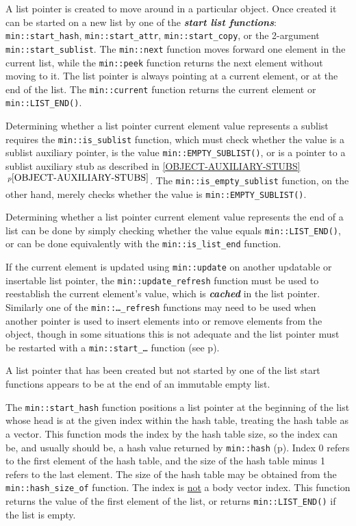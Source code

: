 \documentclass[12pt]{article}
\newcommand{\skey}[2]{{\bf \em #1#2}\index{#1}}
\newcommand{\ikey}[2]{{\bf \em #1}\index{#2}}
\newcommand{\itemref}[1]{\ref{#1}$\,^{p\pageref{#1}}$}
\newcommand{\pagref}[1]{p\pageref{#1}}
\newcommand{\EOL}{\penalty \exhyphenpenalty}
\begin{document}
A list pointer is created to move around in a particular object.
Once created it can be started on a new list by one of the
\skey{start list function}s:
{\tt min::\EOL start\_\EOL hash}, {\tt min::\EOL start\_\EOL attr},
{\tt min::\EOL start\_\EOL copy}, or
the 2-argument {\tt min::\EOL start\_\EOL sublist}.
The {\tt min::\EOL next} function moves forward one element
in the current list,
while the {\tt min::\EOL peek} function returns the next element without
moving to it.
The list pointer is always pointing at a current element, or at
the end of the list.
The {\tt min::\EOL current} function returns the current element
or {\tt min::\EOL LIST\_\EOL END()}.

Determining whether a list pointer current element value
represents a sublist requires
the {\tt min::\EOL is\_\EOL sublist} function, which must check whether the
value is a sublist auxiliary pointer,
is the value {\tt min::\EOL EMPTY\_\EOL SUBLIST()},
or is a pointer to a sublist auxiliary stub as described in
\itemref{OBJECT-AUXILIARY-STUBS}.
The {\tt min::\EOL is\_\EOL empty\_\EOL sublist}
function, on the other hand, merely checks whether the value is
{\tt min::\EOL EMPTY\_\EOL SUBLIST()}.

Determining whether a list pointer current element value
represents the end of a list can be done by
simply checking whether the value equals {\tt min::\EOL LIST\_\EOL END()},
or can be done equivalently
with the {\tt min::\EOL is\_\EOL list\_\EOL end} function.

If the current element
is updated using {\tt min::\EOL update}
on another updatable or insertable list pointer,
the {\tt min::\EOL update\_\EOL refresh} function
must be used to reestablish the
current element's value,
which is \ikey{cached}{cache!list pointer}\label{LIST-POINTER-CACHE}
in the list pointer.
Similarly one of the {\tt min::\EOL\ldots\_refresh} functions may
need to be used when another pointer is used to insert elements into
or remove elements
from the object, though in some situations this is
not adequate and the list pointer must be restarted
with a {\tt min::\EOL start\_\dots} function
(see \pagref{RESTARTING_LIST_PTR}).

A list pointer that has been created but not started by one of the
list start functions appears to be
at the end of an immutable empty list.

The {\tt min::\EOL start\_\EOL hash} function positions
a list pointer at the beginning of the
list whose head is at the given index within the hash table, treating the
hash table as a vector.  This function mods the index by the hash table
size, so the index can be, and usually should be, a hash value returned
by {\tt min::\EOL hash} (\pagref{MIN::HASH}).
Index 0 refers to the first element of the hash table,
and the size of the hash table minus 1 refers to the last element.
The size of the hash table may be obtained from the
{\tt min::\EOL hash\_\EOL size\_\EOL of} function.
The index is \underline{not} a body vector index.
This function returns the value of the first
element of the list, or returns {\tt min::\EOL LIST\_\EOL END()}
if the list is empty.
\end{document}
